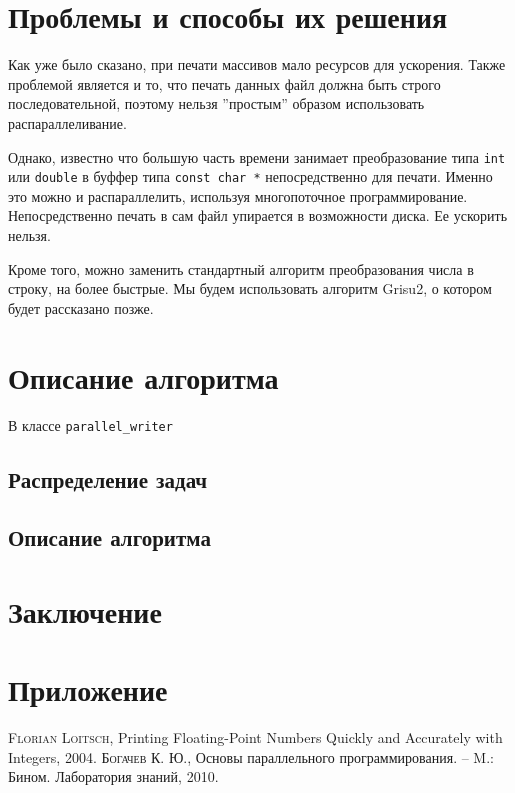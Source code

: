 \documentclass[12pt]{extarticle}
\begin{document}
\section{Проблемы и способы их решения}
Как уже было сказано, при печати массивов мало ресурсов для ускорения.
Также проблемой является и то, что печать данных файл должна быть строго последовательной, поэтому нельзя ''простым'' образом использовать распараллеливание.

Однако, известно что большую часть времени занимает преобразование типа \texttt{int} или \texttt{double} в буффер типа \texttt{const char *} непосредственно для печати.
Именно это можно и распараллелить, используя многопоточное программирование.
Непосредственно печать в сам файл упирается в возможности диска. 
Ее ускорить нельзя.

Кроме того, можно заменить стандартный алгоритм преобразования числа в строку, на более быстрые.
Мы будем использовать алгоритм \textsf{Grisu2}, о котором будет рассказано позже.


\section{Описание алгоритма}
В классе   \texttt{\textcolor[rgb]{0.5,0,0.5}{parallel\_writer}}

\subsection{Распределение задач}


\subsection{Описание алгоритма}
\section{Заключение}


\newpage

\appendix
\section*{Приложение}
\renewcommand{\thesubsection}{(\Alph{subsection})}

\newpage
\begin{thebibliography}{}

 \textsc{Florian Loitsch}, 
Printing Floating-Point Numbers Quickly and Accurately with Integers, 2004.
 \textsc{Богачев К. Ю.}, 
Основы параллельного программирования. -- M.: Бином. Лаборатория знаний, 2010.


\end{thebibliography}
\end{document}
